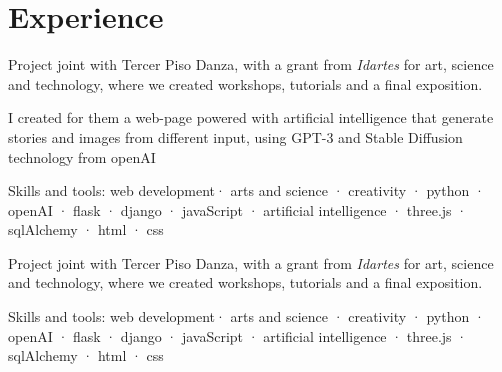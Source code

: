 \documentclass[]{plushcv}
\begin{document}
\begin{minipage}[t]{0.70\textwidth} 



\section{Experience}
\vspace{\topsep} %
\begin{tightemize}
\sectionsep
\item Project joint  with Tercer Piso Danza, with a grant from \emph{Idartes} for art, science and technology, where we created workshops, tutorials and a final exposition. 
\item I created for them a web-page powered with artificial intelligence that generate stories and images from different input, using GPT-3 and Stable Diffusion technology from openAI 
\item Skills and tools: web development· arts and science · creativity · python · openAI · flask · django · javaScript  · artificial intelligence · three.js  ·  sqlAlchemy · html · css%
\end{tightemize}
\sectionsep


\vspace{\topsep} %
\begin{tightemize}
\sectionsep
\item Project joint  with Tercer Piso Danza, with a grant from \emph{Idartes} for art, science and technology, where we created workshops, tutorials and a final exposition. 
\item Skills and tools: web development· arts and science · creativity · python · openAI · flask · django · javaScript  · artificial intelligence · three.js  ·  sqlAlchemy · html · css%
\end{tightemize}
\sectionsep


\end{minipage}
\end{document}
